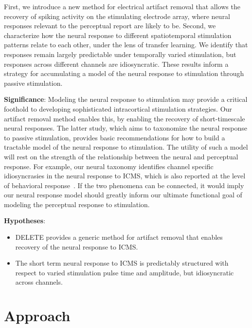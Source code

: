 \documentclass[12pt,oneside]{report}
\begin{document}
First, we introduce a new method for electrical artifact removal that allows the recovery of spiking activity on the stimulating electrode array, where neural responses relevant to the perceptual report are likely to be. Second, we characterize how the neural response to different spatiotemporal stimulation patterns relate to each other, under the lens of transfer learning. We identify that responses remain largely predictable under temporally varied stimulation, but responses across different channels are idiosyncratic. These results inform a strategy for accumulating a model of the neural response to stimulation through passive stimulation.

\textbf{Significance}: Modeling the neural response to stimulation may provide a critical foothold to developing sophisticated intracortical stimulation strategies. Our artifact removal method enables this, by enabling the recovery of short-timescale neural responses. The latter study, which aims to taxonomize the neural response to passive stimulation, provides basic recommendations for how to build a tractable model of the neural response to stimulation. The utility of such a model will rest on the strength of the relationship between the neural and perceptual response. For example, our neural taxonomy identifies channel specific idiosyncrasies in the neural response to ICMS, which is also reported at the level of behavioral response~\citep{greenspon_25_stable,hughes2021perception}. If the two phenomena can be connected, it would imply our neural response model should greatly inform our ultimate functional goal of modeling the perceptual response to stimulation.

\textbf{Hypotheses}:
\begin{itemize}
  \item DELETE provides a generic method for artifact removal that enables recovery of the neural response to ICMS.
  \item The short term neural response to ICMS is predictably structured with respect to varied stimulation pulse time and amplitude, but idiosyncratic across channels.
\end{itemize}

\section{Approach}
\end{document}
